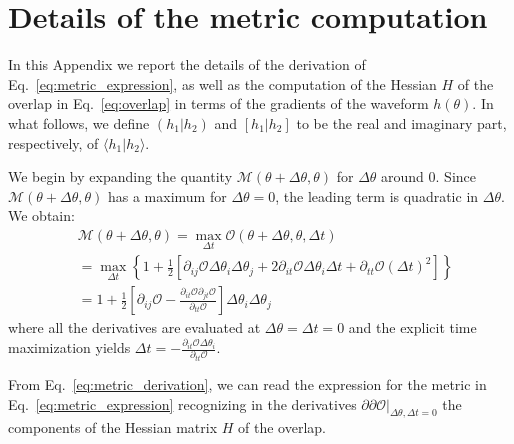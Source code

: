 \documentclass[twocolumn,showpacs,preprintnumbers,nofootinbib,prd,
superscriptaddress,10pt]{revtex4-2}
\newcommand{\scalar}[2]{\langle #1|#2 \rangle}
\newcommand{\rescalar}[2]{( #1 |#2 )}
\newcommand{\imscalar}[2]{[ #1|#2 ]}
\begin{document}
\section{Details of the metric computation}\label{app:metric}

In this Appendix we report the details of the derivation of Eq.~\eqref{eq:metric_expression}, as well as the computation of the Hessian $H$ of the overlap in Eq.~\eqref{eq:overlap} in terms of the gradients of the waveform $h(\theta)$. 
In what follows, we define $\rescalar{h_1}{h_2}$ and $\imscalar{h_1}{h_2}$ to be the real and imaginary part, respectively, of $\scalar{h_1}{h_2}$.

We begin by expanding the quantity $\mathcal{M}(\theta+\Delta\theta,\theta )$ for $\Delta\theta$ around $0$. Since $\mathcal{M}(\theta+\Delta\theta,\theta )$ has a maximum for $\Delta\theta = 0$, the leading term is quadratic in $\Delta\theta$.
We obtain:
\begin{align} \label{eq:metric_derivation}
	&\mathcal{M}(\theta+\Delta\theta,\theta ) = \max_{\Delta t} \mathcal{O}(\theta + \Delta\theta, \theta, \Delta t) \nonumber\\
	& =	\max_{\Delta t} \left\{ 1+ \frac{1}{2}\left[ \partial_{ij}\mathcal{O} \Delta\theta_i \Delta\theta_j + 2  \partial_{it}\mathcal{O} \Delta\theta_i \Delta t + \partial_{tt}\mathcal{O} (\Delta t)^2 \right] \right\}  \nonumber \\
	&= 1 + \frac{1}{2}\left[ \partial_{ij}\mathcal{O} - \frac{\partial_{it}\mathcal{O} \partial_{jt}\mathcal{O}}{\partial_{tt}\mathcal{O}}\right] \Delta\theta_i \Delta\theta_j
\end{align}
where all the derivatives are evaluated at ${\Delta\theta = \Delta t = 0}$ and the explicit time maximization yields
${\Delta t = -\frac{\partial_{it}\mathcal{O} \Delta\theta_i}{\partial_{tt}\mathcal{O}}}$.

From Eq.~\eqref{eq:metric_derivation}, we can read the expression for the metric in Eq.~\eqref{eq:metric_expression} recognizing in the derivatives $\partial\partial\mathcal{O}|_{\Delta\theta, \Delta t = 0}$ the components of the Hessian matrix $H$ of the overlap.
\end{document}
